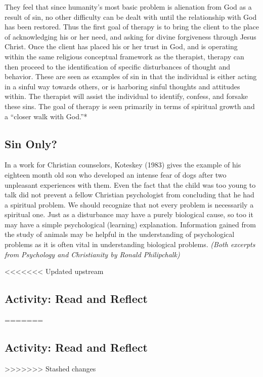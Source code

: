 \documentclass[
]{book}
\begin{document}
They feel that since humanity's most basic problem is alienation from God as a result of sin, no other difficulty can be dealt with until the relationship with God has been restored. Thus the first goal of therapy is to bring the client to the place of acknowledging his or her need, and asking for divine forgiveness through Jesus Christ. Once the client has placed his or her trust in God, and is operating within the same religious conceptual framework as the therapist, therapy can then proceed to the identification of specific disturbances of thought and behavior. These are seen as examples of sin in that the individual is either acting in a sinful way towards others, or is harboring sinful thoughts and attitudes within. The therapist will assist the individual to identify, confess, and forsake these sins. The goal of therapy is seen primarily in terms of spiritual growth and a ``closer walk with God.''*

\hypertarget{sin-only}{%
\subsection*{Sin Only?}\label{sin-only}}

In a work for Christian counselors, Koteskey (1983) gives the example of his eighteen month old son who developed an intense fear of dogs after two unpleasant experiences with them. Even the fact that the child was too young to talk did not prevent a fellow Christian psychologist from concluding that he had a spiritual problem. We should recognize that not every problem is necessarily a spiritual one. Just as a disturbance may have a purely biological cause, so too it may have a simple psychological (learning) explanation. Information gained from the study of animals may be helpful in the understanding of psychological problems as it is often vital in understanding biological problems. \emph{(Both excerpts from Psychology and Christianity by Ronald Philipchalk)}

<<<<<<< Updated upstream
\hypertarget{activity-read-and-reflect-19}{%
\subsection*{Activity: Read and Reflect}\label{activity-read-and-reflect-19}}
=======
\hypertarget{activity-read-and-reflect-18}{%
\subsection*{Activity: Read and Reflect}\label{activity-read-and-reflect-18}}
>>>>>>> Stashed changes
\end{document}
